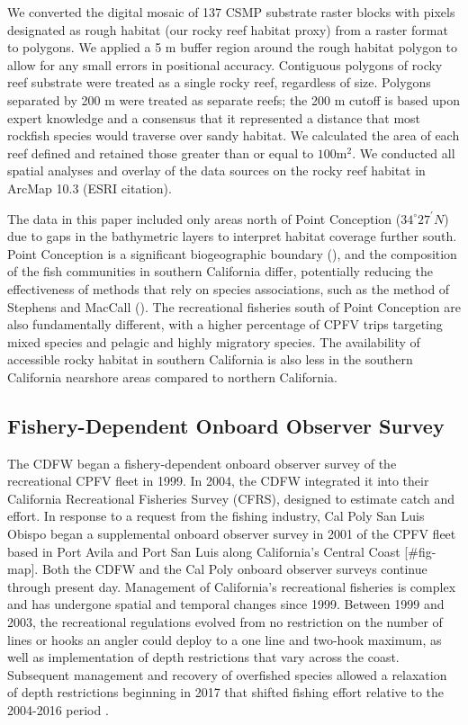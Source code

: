 \documentclass[
  12pt,
  authoryear,
  preprint,
  3p]{elsarticle}
\begin{document}
We converted the digital mosaic of 137 CSMP substrate raster blocks with
pixels designated as rough habitat (our rocky reef habitat proxy) from a
raster format to polygons. We applied a 5 m buffer region around the
rough habitat polygon to allow for any small errors in positional
accuracy. Contiguous polygons of rocky reef substrate were treated as a
single rocky reef, regardless of size. Polygons separated by 200 m were
treated as separate reefs; the 200 m cutoff is based upon expert
knowledge and a consensus that it represented a distance that most
rockfish species would traverse over sandy habitat. We calculated the
area of each reef defined and retained those greater than or equal to
\(100 \mathrm{m^2}\). We conducted all spatial analyses and overlay of
the data sources on the rocky reef habitat in ArcMap 10.3 (ESRI
citation).

The data in this paper included only areas north of Point Conception
(\(34^\circ 27^\prime N\)) due to gaps in the bathymetric layers to
interpret habitat coverage further south. Point Conception is a
significant biogeographic boundary (\citet{Valentine:1966:NAM}), and the
composition of the fish communities in southern California differ,
potentially reducing the effectiveness of methods that rely on species
associations, such as the method of Stephens and MacCall
(\citet{Stephens:2004:MAS}). The recreational fisheries south of Point
Conception are also fundamentally different, with a higher percentage of
CPFV trips targeting mixed species and pelagic and highly migratory
species. The availability of accessible rocky habitat in southern
California is also less in the southern California nearshore areas
compared to northern California.

\hypertarget{fishery-dependent-onboard-observer-survey}{%
\subsection{Fishery-Dependent Onboard Observer
Survey}\label{fishery-dependent-onboard-observer-survey}}

The CDFW began a fishery-dependent onboard observer survey of the
recreational CPFV fleet in 1999. In 2004, the CDFW integrated it into
their California Recreational Fisheries Survey (CFRS), designed to
estimate catch and effort. In response to a request from the fishing
industry, Cal Poly San Luis Obispo began a supplemental onboard observer
survey in 2001 of the CPFV fleet based in Port Avila and Port San Luis
along California's Central Coast {[}\#fig-map{]}. Both the CDFW and the
Cal Poly onboard observer surveys continue through present day.
Management of California's recreational fisheries is complex and has
undergone spatial and temporal changes since 1999. Between 1999 and
2003, the recreational regulations evolved from no restriction on the
number of lines or hooks an angler could deploy to a one line and
two-hook maximum, as well as implementation of depth restrictions that
vary across the coast. Subsequent management and recovery of overfished
species allowed a relaxation of depth restrictions beginning in 2017
that shifted fishing effort relative to the 2004-2016 period
\citep{Monk:2021:SVR}.
\end{document}
